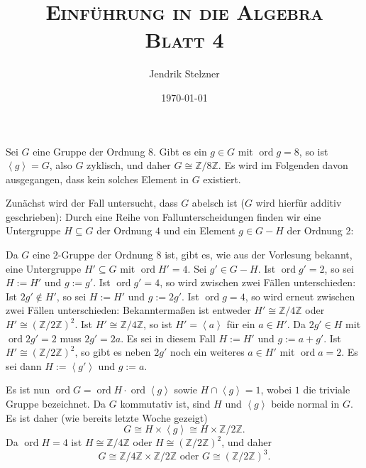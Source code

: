 \documentclass[a4paper,10pt]{article}
\title{\textsc{Einführung in die Algebra \\ \Large Blatt 4}}
\author{Jendrik Stelzner}
\date{\today}
\theoremstyle{definition}
\newcommand{\Z}{\mathbb{Z}}
\newcommand{\ord}{\operatorname{ord}}
\newcommand{\gen}[1]{\left\langle#1\right\rangle}
\begin{document}
\maketitle





\section{}
Sei $G$ eine Gruppe der Ordnung $8$. Gibt es ein $g \in G$ mit $\ord g = 8$, so ist $\gen{g} = G$, also $G$ zyklisch, und daher $G \cong \Z/8\Z$. Es wird im Folgenden davon ausgegangen, dass kein solches Element in $G$ existiert.

Zunächst wird der Fall untersucht, dass $G$ abelsch ist ($G$ wird hierfür additiv geschrieben): Durch eine Reihe von Fallunterscheidungen finden wir eine Untergruppe $H \subseteq G$ der Ordnung $4$ und ein Element $g \in G-H$ der Ordnung 2:

Da $G$ eine $2$-Gruppe der Ordnung $8$ ist, gibt es, wie aus der Vorlesung bekannt, eine Untergruppe $H' \subseteq G$ mit $\ord H' = 4$. Sei $g' \in G-H$. Ist $\ord g' = 2$, so sei $H := H'$ und $g := g'$.
Ist $\ord g' = 4$, so wird zwischen zwei Fällen unterschieden: Ist $2g' \not\in H'$, so sei $H := H'$ und $g := 2g'$. Ist $\ord g = 4$, so wird erneut zwischen zwei Fällen unterschieden: Bekanntermaßen ist entweder $H' \cong \Z/4\Z$ oder $H' \cong (\Z/2\Z)^2$. Ist $H' \cong \Z/4\Z$, so ist $H' = \gen{a}$ für ein $a \in H'$. Da $2g' \in H$ mit $\ord 2g' = 2$ muss $2g' = 2a$. Es sei in diesem Fall $H := H'$ und $g := a+g'$. Ist $H' \cong (\Z/2\Z)^2$, so gibt es neben $2g'$ noch ein weiteres $a \in H'$ mit $\ord a = 2$. Es sei dann $H := \gen{g'}$ und $g := a$.

Es ist nun $\ord G = \ord H \cdot \ord \gen{g}$ sowie $H \cap \gen{g} = 1$, wobei $1$ die triviale Gruppe bezeichnet. Da $G$ kommutativ ist, sind $H$ und $\gen{g}$ beide normal in $G$. Es ist daher (wie bereits letzte Woche gezeigt)
\[
 G \cong H \times \gen{g} \cong H \times \Z/2\Z.
\]
Da $\ord H = 4$ ist $H \cong \Z/4\Z$ oder $H \cong (\Z/2\Z)^2$, und daher
\[
 G \cong \Z/4\Z \times \Z/2\Z \text{ oder } G \cong (\Z/2\Z)^3.
\]
\end{document}
